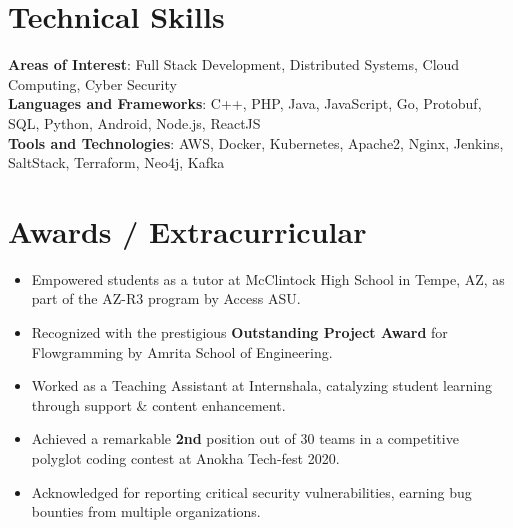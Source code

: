 \documentclass[letterpaper,11pt]{article}
\newcommand{\resumeItem}[1]{
  \item\small{
    {#1 \vspace{-2pt}}
  }
}
\newcommand{\resumeItemListStart}{\begin{itemize}}
\newcommand{\resumeItemListEnd}{\end{itemize}\vspace{-5pt}}
\begin{document}
\section{Technical Skills}
 \begin{itemize}[leftmargin=0.15in, label={}]
    \small{\item{
    \textbf{Areas of Interest}{: Full Stack Development, Distributed Systems, Cloud Computing, Cyber Security} \\
     \textbf{Languages and Frameworks}{: C++, PHP, Java, JavaScript, Go, Protobuf, SQL, Python, Android, Node.js, ReactJS} \\
     \textbf{Tools and Technologies}{: AWS, Docker, Kubernetes, Apache2, Nginx, Jenkins, SaltStack, Terraform, Neo4j, Kafka} \\
    }}
 \end{itemize}
 \vspace{-10pt}


\section{Awards / Extracurricular}
            \resumeItemListStart
                        	\resumeItem{Empowered students as a tutor at McClintock High School in Tempe, AZ, as part of the AZ-R3 program by Access ASU.}\vspace{-5pt}
            	\resumeItem{Recognized with the prestigious \textbf{Outstanding Project Award} for Flowgramming by Amrita School of Engineering.}\vspace{-5pt}
            	\resumeItem{Worked as a Teaching Assistant at Internshala, catalyzing student learning through support \& content enhancement.}
\vspace{-5pt}            	            
                \resumeItem{Achieved a remarkable \textbf{2nd} position out of 30 teams in a competitive polyglot coding contest at Anokha Tech-fest 2020.}\vspace{-5pt}
                \resumeItem{Acknowledged for reporting critical security vulnerabilities, earning bug bounties from multiple organizations.}\vspace{-5pt}
            \resumeItemListEnd
\end{document}
